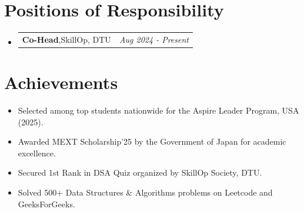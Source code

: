 \documentclass[a4paper,12pt]{article}
\makeatletter
\newcommand{\resumePOR}[3]{
\vspace{0.5mm}\item
    \begin{tabular*}{0.97\textwidth}[t]{l@{\extracolsep{\fill}}r}
        \textbf{#1},\hspace{0.3mm}#2 & \textit{\small{#3}} 
    \end{tabular*}
    \vspace{-2mm}
}
\newcommand{\resumeSubheading}[4]{
\vspace{0.5mm}\item
    \begin{tabular*}{0.98\textwidth}[t]{l@{\extracolsep{\fill}}r}
        \textbf{#1} & \textit{\footnotesize{#4}} \\
        \textit{\footnotesize{#3}} &  \footnotesize{#2}\\
    \end{tabular*}
    \vspace{-2.4mm}
}
\newcommand{\resumeSubHeadingListStart}{\begin{itemize}[leftmargin=*,labelsep=0mm]}
\newcommand{\resumeItemListStart}{\begin{justify}\begin{itemize}[leftmargin=3ex, rightmargin=2ex, noitemsep,labelsep=1.2mm,itemsep=0mm]\small}
\newcommand{\resumeSubHeadingListEnd}{\end{itemize}\vspace{2mm}}
\newcommand{\resumeItemListEnd}{\end{itemize}\end{justify}\vspace{-2mm}}
\makeatother
\begin{document}

\section{\textbf{Positions of Responsibility}}
\vspace{-0.4mm}
\resumeSubHeadingListStart

\resumePOR
{Co-Head}
{SkillOp, DTU}
{Aug 2024 - Present}

\resumeSubHeadingListEnd
\vspace{-4mm}

\section{\textbf{Achievements}}
\vspace{-0.1mm}
\resumeItemListStart
\item Selected among top students nationwide for the Aspire Leader Program, USA (2025).
\item Awarded MEXT Scholarship’25 by the Government of Japan for academic excellence.
\item Secured 1st Rank in DSA Quiz organized by SkillOp Society, DTU.
\item Solved 500+ Data Structures \& Algorithms problems on Leetcode and GeeksForGeeks.
\resumeItemListEnd

\end{document}
